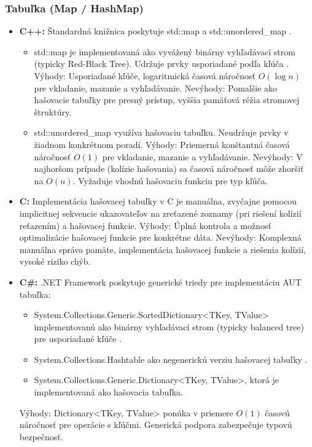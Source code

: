 \documentclass[11pt]{article}
\begin{document}
\subsubsection*{Tabuľka (Map / HashMap)}

\begin{itemize}
  \item \textbf{C++:} Štandardná knižnica poskytuje std::map a std::unordered\_map \cite{c++_containers}.
  \begin{itemize}
    \item std::map je implementovaná ako vyvážený binárny vyhľadávací strom (typicky Red-Black Tree). Udržuje prvky usporiadané podľa kľúča \cite{c++_containers}.
    Výhody: Usporiadané kľúče, logaritmická časová náročnosť $O(\log n)$ pre vkladanie, mazanie a vyhľadávanie.
    Nevýhody: Pomalšie ako hašovacie tabuľky pre presný prístup, vyššia pamäťová réžia stromovej štruktúry.
    \item std::unordered\_map využíva hašovaciu tabuľku. Neudržuje prvky v žiadnom konkrétnom poradí.
    Výhody: Priemerná konštantná časová náročnosť $O(1)$ pre vkladanie, mazanie a vyhľadávanie.
    Nevýhody: V najhoršom prípade (kolízie hašovania) sa časová náročnosť môže zhoršiť na $O(n)$. Vyžaduje vhodnú hašovaciu funkciu pre typ kľúča.
  \end{itemize}
  \item \textbf{C:} Implementácia hašovacej tabuľky v C je manuálna, zvyčajne pomocou implicitnej sekvencie ukazovateľov na zreťazené zoznamy (pri riešení kolízií reťazením) a hašovacej funkcie.
  Výhody: Úplná kontrola a možnosť optimalizácie hašovacej funkcie pre konkrétne dáta.
  Nevýhody: Komplexná manuálna správa pamäte, implementácia hašovacej funkcie a riešenia kolízií, vysoké riziko chýb.
  \item \textbf{C\#:} .NET Framework poskytuje generické triedy pre implementáciu AUT tabuľka:
  \begin{itemize}
    \item System.Collections.Generic.SortedDictionary<TKey, TValue> implementovanú ako binárny vyhľadávací strom (typicky balanced tree) pre usporiadané kľúče \cite{dotnet_docs}.
    \item System.Collections.Hashtable ako negenerickú verziu hašovacej tabuľky \cite{dotnet_docs}.
    \item System.Collections.Generic.Dictionary<TKey, TValue>, ktorá je implementovaná ako hašovacia tabuľka.
  \end{itemize}
  Výhody: Dictionary<TKey, TValue> ponúka v priemere $O(1)$ časovú náročnosť pre operácie s kľúčmi. Generická podpora zabezpečuje typovú bezpečnosť.


\end{itemize}
\end{document}
